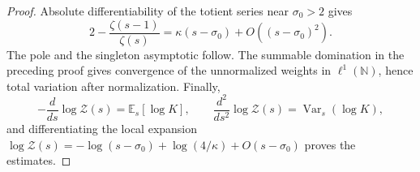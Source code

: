 \begin{proof}
Absolute differentiability of the totient series near \(\sigma_0>2\) gives
\[
 2-\frac{\zeta(s-1)}{\zeta(s)}
 =\kappa(s-\sigma_0)+O((s-\sigma_0)^2).
\]
The pole and the singleton asymptotic follow.  The summable domination in
the preceding proof gives convergence of the unnormalized weights in
\(\ell^1(\mathbb N)\), hence total variation after normalization.  Finally,
\[
 -\frac{d}{ds}\log\mathcal Z(s)=\mathbb E_s[\log K],
 \qquad
 \frac{d^2}{ds^2}\log\mathcal Z(s)=\operatorname{Var}_s(\log K),
\]
and differentiating the local expansion
\(\log\mathcal Z(s)=-\log(s-\sigma_0)+\log(4/\kappa)+O(s-\sigma_0)\)
proves the estimates.
\end{proof}
\fi
